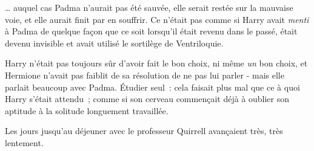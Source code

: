 … auquel cas Padma n'aurait pas été sauvée, elle serait restée sur la mauvaise voie, et elle aurait finit par en souffrir. Ce n'était pas comme si Harry avait \emph{menti} à Padma de quelque façon que ce soit lorsqu'il était revenu dans le passé, était devenu invisible et avait utilisé le sortilège de Ventriloquie.

Harry n'était pas toujours sûr d'avoir fait le bon choix, ni même \emph{un} bon choix, et Hermione n'avait pas faiblit de sa résolution de ne pas lui parler - mais elle parlait beaucoup avec Padma. Étudier seul~: cela faisait plus mal que ce à quoi Harry s'était attendu~; comme si son cerveau commençait déjà à oublier son aptitude à la solitude longuement travaillée.

Les jours jusqu'au déjeuner avec le professeur Quirrell avançaient très, très lentement. 

